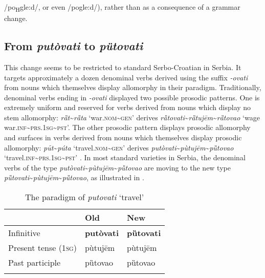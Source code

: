 \documentclass[output=paper,modfonts,nonflat
]{langsci/langscibook}
\begin{document}
/po\textsubscript{H}gle:d/, or even /pogle:d/), rather than as a consequence of a grammar change.

\subsection{From \textit{putòvati} to \textit{pȕtovati}} \label{sec:kager:subsec25}
\sloppy This change seems to be restricted to standard Serbo-Croatian in Serbia. It targets approximately a dozen denominal verbs derived using the suffix \textit{-ovati} from nouns which themselves display allomorphy in their paradigm. Traditionally, denominal verbs ending in \textit{-ovati} displayed two possible prosodic patterns. One is extremely uniform and reserved for verbs derived from nouns which display no stem allomorphy: \textit{rȁt}\textasciitilde{}\textit{rȁta} `war.\textsc{nom}\textasciitilde{}\textsc{gen}' derives \textit{rȁtovati}\textasciitilde{}\textit{rȁtujēm}\textasciitilde{}\textit{rȁtovao} `wage war.\textsc{inf}\textasciitilde{}\textsc{prs.1}\textsc{sg}\textasciitilde{}\textsc{pst}'. The other prosodic pattern displays prosodic allomorphy and surfaces in verbs derived from nouns which themselves display prosodic allomorphy: \textit{pȗt}\textasciitilde{}\textit{púta} `travel.\textsc{nom}\textasciitilde{}\textsc{gen}' derives \textit{putòvati}\textasciitilde{}\textit{pùtujēm}\textasciitilde{}\textit{pȕtovao} `travel.\textsc{inf}\textasciitilde{}\textsc{prs.1}\textsc{sg}\textasciitilde{}\textsc{pst}' \citep[for a detailed analysis see][]{Simonovic2015}. 
In most standard varieties in Serbia, the denominal verbs of the type \textit{putòvati}\textasciitilde{}\textit{pùtujēm}\textasciitilde{}\textit{pȕtovao} are moving to the new type \textit{pȕtovati}\textasciitilde{}\textit{pùtujēm}\textasciitilde{}\textit{pȕtovao}, as illustrated in . 

\begin{table}
\caption{ The paradigm of \textit{putovati} `travel'}
\label{tab:kager:6}
 \begin{tabular}{  l l l }
  \lsptoprule
& Old & New\\ 
 \midrule
Infinitive  &  \textbf{putòvati}  &   \textbf{pȕtovati}\\
Present tense (1\textsc{sg})  &  pùtujēm & pùtujēm\\
Past participle  &  pȕtovao & pȕtovao \\
 \lspbottomrule
 \end{tabular}
\end{table}
\end{document}
